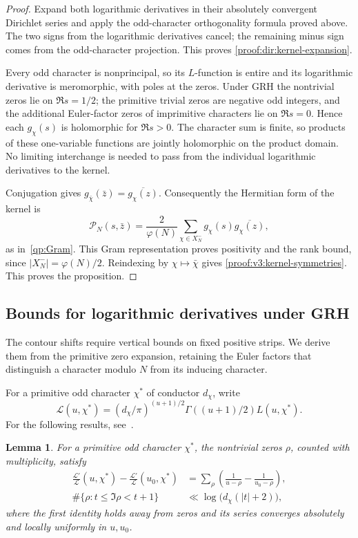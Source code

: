 \documentclass[12pt,a4paper]{amsart}
\numberwithin{equation}{section}
\def\le{\leqslant}
\theoremstyle{plain}
\newtheorem{lemma}[proposition]{Lemma}
\theoremstyle{definition}
\theoremstyle{remark}
\begin{document}
\begin{proof}
Expand both logarithmic derivatives in their absolutely convergent
Dirichlet series and apply the odd-character orthogonality formula
proved above.
The two signs from the logarithmic derivatives cancel; the remaining
minus sign comes from the odd-character projection. This proves
\eqref{proof:dir:kernel-expansion}.

Every odd character is nonprincipal, so its $L$-function is entire
and its logarithmic derivative is meromorphic, with poles at the zeros.
Under GRH the nontrivial zeros lie on $\Re s=1/2$; the primitive
trivial zeros are negative odd integers, and the additional Euler-factor
zeros of imprimitive characters lie on $\Re s=0$. Hence each
$g_\chi(s)$ is holomorphic for $\Re s>0$.
The character sum is finite, so products of these one-variable
functions are jointly holomorphic on the product domain.
No limiting interchange is needed to pass from the individual
logarithmic derivatives to the kernel.

Conjugation gives $g_{\bar\chi}(\bar z)=\overline{g_\chi(z)}$.
Consequently the Hermitian form of the kernel is
\[
 \mathscr P_N(s,\bar z)=\frac2{\varphi(N)}\sum_{\chi\in X_N^-}
                    g_\chi(s)\overline{g_\chi(z)},
\]
as in~\eqref{qp:Gram}.
This Gram representation proves positivity and the rank bound,
since $|X_N^-|=\varphi(N)/2$. Reindexing by
$\chi\mapsto\bar\chi$ gives \eqref{proof:v3:kernel-symmetries}.
This proves the proposition.
\end{proof}

\subsection{Bounds for logarithmic derivatives under GRH}

The contour shifts require vertical bounds on fixed positive strips.
We derive them from the primitive zero expansion, retaining the Euler
factors that distinguish a character modulo $N$ from its inducing character.

For a primitive odd character $\chi^*$ of conductor $d_\chi$, write
\[
 \mathcal L(u,\chi^*)=(d_\chi/\pi)^{(u+1)/2}
 \Gamma((u+1)/2)L(u,\chi^*).
\]
For the following results, see~\cite{IK2004}.

\begin{lemma}\label{proof:v9:primitive-zero-data}
For a primitive odd character $\chi^*$, the nontrivial zeros $\rho$,
counted with multiplicity, satisfy
\begin{align}
 \frac{\mathcal L'}{\mathcal L}(u,\chi^*)
 -\frac{\mathcal L'}{\mathcal L}(u_0,\chi^*)
 &=\sum_\rho\left(\frac1{u-\rho}-\frac1{u_0-\rho}\right),
       \label{proof:gb:hadamard-difference}\\
 \#\{\rho:t\le\Im\rho<t+1\}
 &\ll\log\bigl(d_\chi(|t|+2)\bigr),\label{proof:gb:local-zero-count}
\end{align}
where the first identity holds away from zeros and its series
converges absolutely and locally uniformly in $u,u_0$.
\end{lemma}
\end{document}
